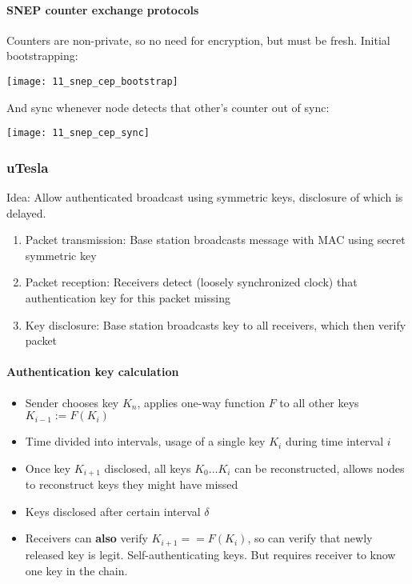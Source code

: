 \paragraph{SNEP counter exchange protocols}

Counters are non-private, so no need for encryption, but must be fresh. Initial
bootstrapping:

\texttt{[image: 11\_snep\_cep\_bootstrap]}

And sync whenever node detects that other's counter out of sync:

\texttt{[image: 11\_snep\_cep\_sync]}


\subsubsection{uTesla}

Idea: Allow authenticated broadcast using symmetric keys, disclosure of which
is delayed.

\begin{enumerate}
		\item Packet transmission: Base station broadcasts message with MAC
				using secret symmetric key
		\item Packet reception: Receivers detect (loosely synchronized clock)
				that authentication key for this packet missing
		\item Key disclosure: Base station broadcasts key to all receivers,
				which then verify packet
\end{enumerate}

\paragraph{Authentication key calculation}

\begin{itemize}
		\item Sender chooses key $K_n$, applies one-way function $F$ to all other keys $K_{i-1} := F(K_{i})$
		\item Time divided into intervals, usage of a single key $K_i$ during time interval $i$
		\item Once key $K_{i+1}$ disclosed, all keys $K_0 \ldots K_i$ can be
				reconstructed, allows nodes to reconstruct keys they might have
				missed
		\item Keys disclosed after certain interval $\delta$
		\item Receivers can \textbf{also} verify $K_{i+1} == F(K_i)$, so can
				verify that newly released key is legit. Self-authenticating
				keys. But requires receiver to know one key in the chain.
\end{itemize}

